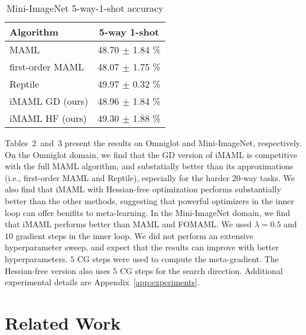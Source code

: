 \documentclass{article} \usepackage[nonatbib, final]{mod_neurips}
\begin{document}
\begin{wraptable}{r}{0.45\textwidth}
\label{table:imagenet_results}
\centering
\caption{\footnotesize Mini-ImageNet 5-way-1-shot accuracy}
\begin{tabular}{l|c}
\toprule
Algorithm    & 5-way 1-shot   \\ \midrule
MAML & 48.70 $\pm$ 1.84 \%  \\
first-order MAML & 48.07 $\pm$ 1.75 \% \\
Reptile & 49.97 $\pm$ 0.32 \% \\
iMAML GD (ours) &  48.96 $\pm$ 1.84 \% \\
iMAML HF (ours) &  49.30 $\pm$ 1.88 \% \\
\bottomrule
\end{tabular}
\label{table:imagenet}
\end{wraptable}
Tables~2~and~3 present the results on Omniglot and Mini-ImageNet, respectively. On the Omniglot domain, we find that the GD version of iMAML is competitive with the full MAML algorithm, and substatially better than its approximations (i.e., first-order MAML and Reptile), especially for the harder 20-way tasks. We also find that iMAML with Hessian-free optimization performs substantially better than the other methods, suggesting that powerful optimizers in the inner loop can offer benifits to meta-learning. In the Mini-ImageNet domain, we find that iMAML performs better than MAML and FOMAML. We used $\lambda=0.5$ and $10$ gradient steps in the inner loop. We did not perform an extensive hyperparameter sweep, and expect that the results can improve with better hyperparameters. $5$ CG steps were used to compute the meta-gradient. The Hessian-free version also uses $5$ CG steps for the search direction. Additional experimental details are Appendix~\ref{app:experiments}.


 

\vspace{-0.1cm}
\section{Related Work}
\vspace{-0.1cm}
\end{document}
